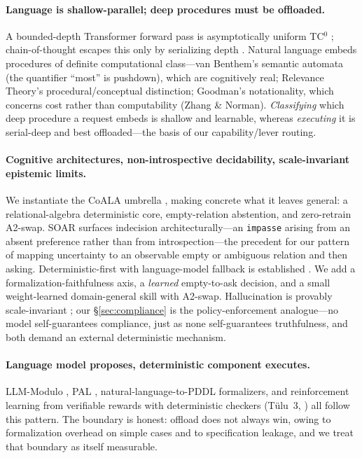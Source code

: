 \documentclass[10pt]{article}
\begin{document}
\paragraph{Language is shallow-parallel; deep procedures must be offloaded.} A bounded-depth Transformer forward pass is asymptotically uniform TC$^0$ \citep{ax2207_00729}; chain-of-thought escapes this only by serializing depth \citep{ax2305_15408,ax2402_12875}. Natural language embeds procedures of definite computational class---van Benthem's semantic automata (the quantifier ``most'' is pushdown), which are cognitively real; Relevance Theory's procedural/conceptual distinction; Goodman's notationality, which concerns cost rather than computability (Zhang \& Norman). \emph{Classifying} which deep procedure a request embeds is shallow and learnable, whereas \emph{executing} it is serial-deep and best offloaded---the basis of our capability/lever routing.

\paragraph{Cognitive architectures, non-introspective decidability, scale-invariant epistemic limits.} We instantiate the CoALA umbrella \citep{ax2309_02427}, making concrete what it leaves general: a relational-algebra deterministic core, empty-relation abstention, and zero-retrain A2-swap. SOAR \citep{ax2505_07087} surfaces indecision architecturally---an \texttt{impasse} arising from an absent preference rather than from introspection---the precedent for our pattern of mapping uncertainty to an observable empty or ambiguous relation and then asking. Deterministic-first with language-model fallback is established \citep{ax2403_00810,ax2510_09355}. We add a formalization-faithfulness axis, a \emph{learned} empty-to-ask decision, and a small weight-learned domain-general skill with A2-swap. Hallucination is provably scale-invariant \citep{ax2401_11817,ax2509_04664}; our \S\ref{sec:compliance} is the policy-enforcement analogue---no model self-guarantees compliance, just as none self-guarantees truthfulness, and both demand an external deterministic mechanism.

\paragraph{Language model proposes, deterministic component executes.} LLM-Modulo \citep{ax2402_01817}, PAL \citep{ax2211_10435}, natural-language-to-PDDL formalizers, and reinforcement learning from verifiable rewards with deterministic checkers (T\"ulu~3, \citealp{ax2411_15124}) all follow this pattern. The boundary is honest: offload does not always win, owing to formalization overhead on simple cases and to specification leakage, and we treat that boundary as itself measurable.
\end{document}
